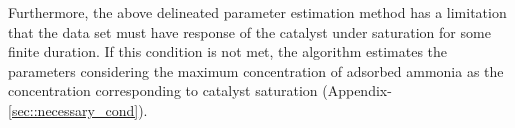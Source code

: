 \par Furthermore, the above delineated parameter estimation method has a limitation that the data set must have response
of the catalyst under saturation for some finite duration. If this condition is not met, the algorithm estimates the
parameters considering the maximum concentration of adsorbed ammonia as the concentration corresponding to catalyst
saturation (Appendix-\ref{sec::necessary_cond}).
